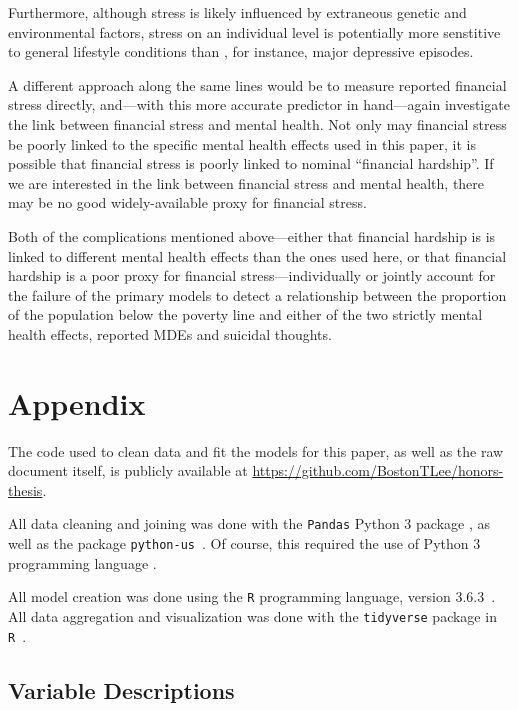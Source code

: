 \documentclass{article}
\begin{document}
Furthermore, although stress is likely influenced by
extraneous genetic and environmental factors,
stress on an individual level is potentially more
senstitive to general lifestyle conditions than
, for instance,
major depressive episodes.

A different approach along the same lines would be
to measure reported financial stress directly,
and---with this more accurate predictor in hand---again
investigate the link between financial stress
and mental health.
Not only may financial stress be poorly linked to
the specific mental health effects used in this paper,
it is possible that financial stress is poorly linked
to nominal ``financial hardship''.
If we are interested in the link between financial stress and mental health,
there may be no good widely-available proxy for financial stress.

Both of the complications mentioned above---either
that financial hardship is is linked to different mental
health effects than the ones used here,
or that financial hardship is a poor proxy for financial
stress---individually or jointly account for the
failure of the primary models to detect a relationship
between the proportion of the population below the poverty line
and either of the two strictly mental health effects,
reported MDEs and suicidal thoughts.

\section{Appendix}

The code used to clean data and fit the models for this
paper, as well as the raw document itself,
is publicly available at
\url{https://github.com/BostonTLee/honors-thesis}.

All data cleaning and joining was done with the \texttt{Pandas} Python 3 package
\cite{python_pandas}, as well as the package \texttt{python-us}~\cite{python_us}.
Of course, this required the use of Python 3 programming language
\cite{python_lang}.

All model creation was done using the \texttt{R} programming
language, version 3.6.3~\cite{r_lang}.
All data aggregation and visualization was done with the
\texttt{tidyverse} package in \texttt{R}~\cite{r_tidyverse}.

\subsection{Variable Descriptions}\label{sec:variables}
\end{document}
